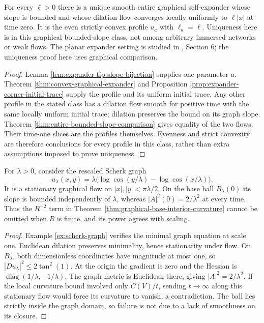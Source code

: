 \begin{theorem}\label{thm:prescribed-symmetric-corner-expander}
For every $\ell>0$ there is a unique smooth entire graphical self-expander whose slope is bounded and whose dilation flow converges locally uniformly to $\ell|x|$ at time zero. It is the even strictly convex profile $u_a$ with $\ell_a=\ell$. Uniqueness here is in this graphical bounded-slope class, not among arbitrary immersed networks or weak flows. The planar expander setting is studied in \cite{Hal12}, Section 6; the uniqueness proof here uses graphical comparison.
\end{theorem}
\begin{proof}
Lemma \ref{lem:expander-tip-slope-bijection} supplies one parameter $a$. Theorem \ref{thm:convex-graphical-expander} and Proposition \ref{prop:expander-corner-initial-trace} supply the profile and its uniform initial trace. Any other profile in the stated class has a dilation flow smooth for positive time with the same locally uniform initial trace; dilation preserves the bound on its graph slope. Theorem \ref{thm:entire-bounded-slope-comparison} gives equality of the two flows. Their time-one slices are the profiles themselves. Evenness and strict convexity are therefore conclusions for every profile in this class, rather than extra assumptions imposed to prove uniqueness.
\end{proof}

\begin{example}\label{ex:scherk-local-curvature-scale}
For $\lambda>0$, consider the rescaled Scherk graph
\[
 u_\lambda(x,y)=\lambda\bigl(\log\cos(y/\lambda)-\log\cos(x/\lambda)\bigr).
\]
It is a stationary graphical flow on $|x|,|y|<\pi\lambda/2$. On the base ball $B_\lambda(0)$ its slope is bounded independently of $\lambda$, whereas $|A|^2(0)=2/\lambda^2$ at every time. Thus the $R^{-2}$ term in Theorem \ref{thm:graphical-base-interior-curvature} cannot be omitted when $R$ is finite, and its power agrees with scaling.
\end{example}
\begin{proof}
Example \ref{ex:scherk-graph} verifies the minimal graph equation at scale one. Euclidean dilation preserves minimality, hence stationarity under flow. On $B_\lambda$, both dimensionless coordinates have magnitude at most one, so $|Du_\lambda|^2\leq2\tan^2(1)$. At the origin the gradient is zero and the Hessian is $\operatorname{diag}(1/\lambda,-1/\lambda)$. The graph metric is Euclidean there, giving $|A|^2=2/\lambda^2$. If the local curvature bound involved only $C(V)/t$, sending $t\to\infty$ along this stationary flow would force its curvature to vanish, a contradiction. The ball lies strictly inside the graph domain, so failure is not due to a lack of smoothness on its closure.
\end{proof}
